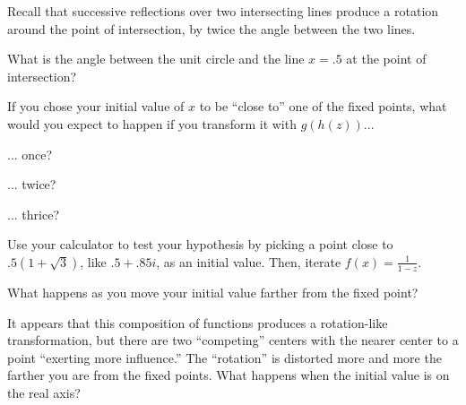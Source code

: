 \documentclass[../gatm_answers.tex]{subfiles}
\begin{document}
\begin{outer_problem}
\item Recall that successive reflections over two intersecting lines produce a rotation around the point of intersection, by twice the angle between the two lines.
\end{outer_problem}

\begin{inner_problem}[start=1]
\item What is the angle between the unit circle and the line $x=.5$ at the point of intersection?
\end{inner_problem}

\begin{inner_problem}
\item If you chose your initial value of $x$ to be ``close to'' one of the fixed points, what would you expect to happen if you transform it with $g(h(z))$...
\end{inner_problem}

\begin{iinner_problem}[start=1]
\item ... once?
\end{iinner_problem}

\begin{iinner_problem}
\item ... twice?
\end{iinner_problem}

\begin{iinner_problem}
\item ... thrice?
\end{iinner_problem}

\begin{outer_problem}
\item
\end{outer_problem}

\begin{inner_problem}[start=1]
\item Use your calculator to test your hypothesis by picking a point close to $.5(1+\sqrt{3})$, like $.5+.85i$, as an initial value. Then, iterate $f(x)=\frac{1}{1-z}$.
\end{inner_problem}

\begin{inner_problem}
\item What happens as you move your initial value farther from the fixed point?
\end{inner_problem}

\begin{outer_problem}
\item It appears that this composition of functions produces a rotation-like transformation, but there are two ``competing'' centers with the nearer center to a point ``exerting more influence.'' The ``rotation'' is distorted more and more the farther you are from the fixed points. What happens when the initial value is on the real axis?
\end{outer_problem}
\end{document}
